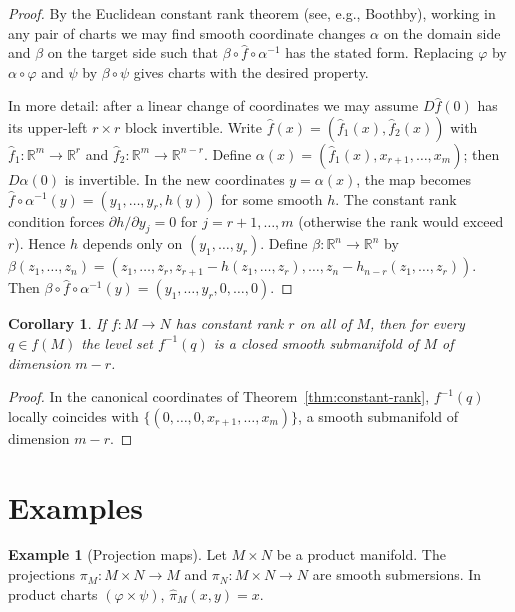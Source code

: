 \documentclass[12pt,a4paper,openany]{book}
\newtheorem{corollary}[theorem]{Corollary}
\theoremstyle{definition}
\newtheorem{example}[theorem]{Example}
\theoremstyle{remark}
\newcommand{\R}{\mathbb{R}}
\begin{document}
\begin{proof}
By the Euclidean constant rank theorem (see, e.g., Boothby), working in any
pair of charts we may find smooth coordinate changes
$\alpha$ on the domain side and $\beta$ on the target side such that
$\beta \circ \hat{f} \circ \alpha^{-1}$ has the stated form.  Replacing
$\varphi$ by $\alpha \circ \varphi$ and $\psi$ by $\beta \circ \psi$ gives
charts with the desired property.

In more detail: after a linear change of coordinates we may assume
$D\hat{f}(0)$ has its upper-left $r \times r$ block invertible.  Write
$\hat{f}(x) = (\hat{f}_1(x), \hat{f}_2(x))$ with
$\hat{f}_1 \colon \R^m \to \R^r$ and $\hat{f}_2 \colon \R^m \to \R^{n-r}$.
Define $\alpha(x) = (\hat{f}_1(x), x_{r+1}, \ldots, x_m)$; then
$D\alpha(0)$ is invertible.  In the new coordinates $y = \alpha(x)$,
the map becomes $\hat{f} \circ \alpha^{-1}(y) = (y_1, \ldots, y_r,
h(y))$ for some smooth $h$.  The constant rank condition forces
$\partial h / \partial y_j = 0$ for $j = r+1, \ldots, m$ (otherwise the
rank would exceed $r$).  Hence $h$ depends only on $(y_1, \ldots, y_r)$.
Define $\beta \colon \R^n \to \R^n$ by
$\beta(z_1,\ldots,z_n) = (z_1,\ldots,z_r, z_{r+1} - h(z_1,\ldots,z_r),
\ldots, z_n - h_{n-r}(z_1,\ldots,z_r))$.  Then
$\beta \circ \hat{f} \circ \alpha^{-1}(y) = (y_1,\ldots,y_r,0,\ldots,0)$.
\end{proof}

\begin{corollary}\label{cor:constant-rank-level-set}
If $f \colon M \to N$ has constant rank $r$ on all of $M$, then for every
$q \in f(M)$ the level set $f^{-1}(q)$ is a closed smooth submanifold of
$M$ of dimension $m - r$.
\end{corollary}

\begin{proof}
In the canonical coordinates of Theorem~\ref{thm:constant-rank},
$f^{-1}(q)$ locally coincides with $\{(0,\ldots,0,x_{r+1},\ldots,x_m)\}$,
a smooth submanifold of dimension $m - r$.
\end{proof}

\section{Examples}
\label{sec:examples-ch2}

\begin{example}[Projection maps]\label{ex:projections}
Let $M \times N$ be a product manifold.  The projections
$\pi_M \colon M \times N \to M$ and $\pi_N \colon M \times N \to N$ are
smooth submersions.  In product charts
$(\varphi \times \psi)$, $\hat{\pi}_M(x,y) = x$.
\end{example}
\end{document}
